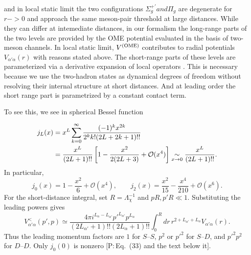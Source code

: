 \documentclass[11pt,a4paper]{article}
\newcommand{\tagP}[1]{\textcolor{blue!65!black}{\textsf{\small[P:\,#1]}}}
\renewcommand{\VOME}{V^{\rm (OME)}}
\newenvironment{aiadd}{\par}{\par}
\begin{document}
and in local static limit the two configurations $\Sigma_g^{+'} and \Pi_g$ are degenerate for $r->0$ and approach the same meson-pair threshold at large distances. While they can differ at intemediate distances, in our formalism the long-range parts of the two levels are provided by the OME potential evaluated in the basis of two-meson channels. In local static limit, $\VOME$ contributes to radial potentials $V_{\alpha' \alpha}(r)$ with reasons stated above. The short-range parts of these levels are parameterized via a derivative expansion of local operators . This is necessary because we use the two-hadron states as dynamical degrees of freedom without resolving their internal structure at short distances. And at leading order the short range part is parametrized by a constant contact term.

To see this, we see in spherical Bessel function
\begin{aiadd}
	\begin{align}
		j_L(x)
		&=x^L\sum_{k=0}^\infty
		\frac{(-1)^k x^{2k}}{2^k k!(2L+2k+1)!!}
		\notag\\
		&=\frac{x^L}{(2L+1)!!}
		\left[1-\frac{x^2}{2(2L+3)}+\mathcal O(x^4)\right]
		\underset{x\to0}{\sim}\frac{x^L}{(2L+1)!!}.
		\label{eq:pc-bessel}
	\end{align}
	In particular,
	\[
		j_0(x)=1-\frac{x^2}{6}+\mathcal O(x^4),\qquad
		j_2(x)=\frac{x^2}{15}-\frac{x^4}{210}+\mathcal O(x^6).
	\]
	For the short-distance integral, set $R=\Lambda_\chi^{-1}$ and
	$pR,p'R\ll1$. Substituting the leading powers gives
	\[
		V^<_{\alpha'\alpha}(p',p)\simeq
		\frac{4\pi i^{L_\alpha-L_{\alpha'}}p'^{L_{\alpha'}}p^{L_\alpha}}
		{(2L_{\alpha'}+1)!!(2L_\alpha+1)!!}
		\int_0^R dr\,r^{2+L_{\alpha'}+L_\alpha}V_{\alpha'\alpha}(r).
	\]
	Thus the leading momentum factors are $1$ for $S$--$S$, $p^2$ or
	$p'^2$ for $S$--$D$, and $p'^2p^2$ for $D$--$D$.
	Only $j_0(0)$ is nonzero \tagP{Eq.~(33) and the text below it}.
\end{aiadd}
\end{document}
